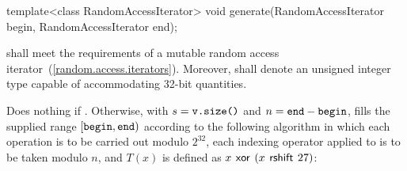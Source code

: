%
\begin{itemdecl}
template<class RandomAccessIterator>
  void generate(RandomAccessIterator begin, RandomAccessIterator end);
\end{itemdecl}

\begin{itemdescr}
\pnum\requires {}
  shall meet the requirements of a mutable random access iterator~(\ref{random.access.iterators}).
  Moreover,
  shall denote an unsigned integer type
  capable of accommodating 32-bit quantities.

\pnum\effects
 Does nothing if .
 Otherwise,
 with $ s = \texttt{\protect v.size()} $
 and  $ n = \texttt{\protect end} - \texttt{\protect begin} $,
 fills the supplied range $[\texttt{\protect begin},\texttt{\protect end})$
 according to the following algorithm
 in which
 each operation is to be carried out modulo $2^{32}$,
 each indexing operator applied to  is to be taken modulo $n$,
 and $T(x)$ is defined as $ x \, \mathbin{\mathsf{xor}} \, (x \, \mathbin{\mathsf{rshift}} \, 27)$:


\end{itemdescr}
